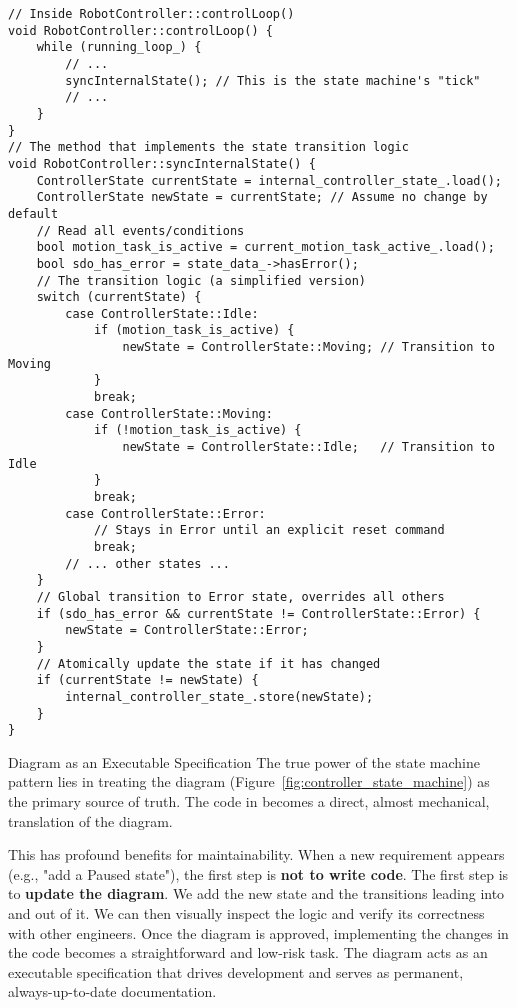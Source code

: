 \newpage
\begin{verbatim}
// Inside RobotController::controlLoop()
void RobotController::controlLoop() {
    while (running_loop_) {
        // ...
        syncInternalState(); // This is the state machine's "tick"
        // ...
    }
}
// The method that implements the state transition logic
void RobotController::syncInternalState() {
    ControllerState currentState = internal_controller_state_.load();
    ControllerState newState = currentState; // Assume no change by default
    // Read all events/conditions
    bool motion_task_is_active = current_motion_task_active_.load();
    bool sdo_has_error = state_data_->hasError();
    // The transition logic (a simplified version)
    switch (currentState) {
        case ControllerState::Idle:
            if (motion_task_is_active) {
                newState = ControllerState::Moving; // Transition to Moving
            }
            break;
        case ControllerState::Moving:
            if (!motion_task_is_active) {
                newState = ControllerState::Idle;   // Transition to Idle
            }
            break;
        case ControllerState::Error:
            // Stays in Error until an explicit reset command
            break;
        // ... other states ...
    }
    // Global transition to Error state, overrides all others
    if (sdo_has_error && currentState != ControllerState::Error) {
        newState = ControllerState::Error;
    }
    // Atomically update the state if it has changed
    if (currentState != newState) {
        internal_controller_state_.store(newState);
    }
}
\end{verbatim}
\label{lst:state-machine-impl}

\begin{tipbox}{Diagram as an Executable Specification}
The true power of the state machine pattern lies in treating the diagram (Figure~\ref{fig:controller_state_machine}) as the primary source of truth. The code in  becomes a direct, almost mechanical, translation of the diagram.

This has profound benefits for maintainability. When a new requirement appears (e.g., "add a Paused state"), the first step is \textbf{not to write code}. The first step is to \textbf{update the diagram}. We add the new state and the transitions leading into and out of it. We can then visually inspect the logic and verify its correctness with other engineers. Once the diagram is approved, implementing the changes in the code becomes a straightforward and low-risk task. The diagram acts as an executable specification that drives development and serves as permanent, always-up-to-date documentation.
\end{tipbox}

